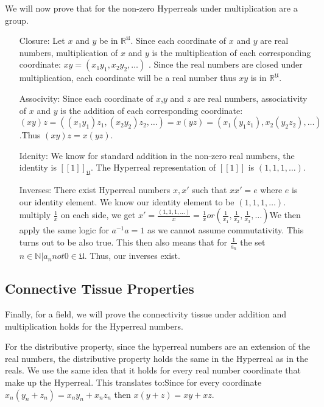 \documentclass[12pt]{report}
\newcommand{\R}{\mathbb{R}}
\newcommand{\N}{\mathbb{N}}
\newcommand{\U}{\mathfrak{U}}
\begin{document}
We will now prove that for the non-zero Hyperreals under multiplication are a group.
\begin{enumerate}
    \item[Closure:]Let $x$ and $y$ be in $\R^{\U}$.
    Since each coordinate of $x$ and $y$ are real numbers, multiplication of $x$ and $y$ is the multiplication of each corresponding coordinate: $xy = (x_1 y_1, x_2 y_2,\ldots)$ .
    Since the real numbers are closed under multiplication, each coordinate will be a real number thus $xy$ is in $\R^\U$.
    \item[Associvity:] Since each coordinate of $x$,$y$ and $z$ are real numbers, associativity of $x$ and $y $ is the addition of each corresponding coordinate: $(xy)z = ((x_1 y_1)z_1, (x_2 y_2)z_2,\ldots) =x(yz) = (x_1  (y_1 z_1), x_2(y_2 z_2),\ldots)$.Thus $(xy)z= x(yz)$.
    \item[Idenity:]We know for standard addition in the non-zero real numbers, the identity is $[[1]]_{\U}$.
    The Hyperreal representation of $[[1]]$ is $(1, 1, 1,\ldots)$.
    \item[Inverses:]There exist Hyperreal numbers $x, x'$ such that $xx' = e $ where $e$ is our identity element.
    We know our identity element to be $(1, 1, 1, \ldots)$.
    multiply $\frac{1}{x}$ on each side, we get $x' = \frac{(1, 1, 1,\ldots)}{x} = \frac{1}{x} or (\frac{1}{x_1}, \frac{1}{x_2}, \frac{1}{x_3},\ldots)$We then apply the same logic for $a^{-1} a =1$ as we cannot assume commutativity.
    This turns out to be also true.
    This then also means that for $\frac{1}{a_n}$ the set ${n \in \N| a_n not 0 } \in \U$.
    Thus, our inverses exist.
\end{enumerate}
\subsection*{Connective Tissue Properties}
Finally, for a field, we will prove the connectivity tissue under addition and multiplication holds for the Hyperreal numbers.
\newline \par
For the distributive property, since the hyperreal numbers are an extension of the real numbers, the distributive property holds the same in the Hyperreal as in the reals.
We use the same idea that it holds for every real number coordinate that make up the Hyperreal.
This translates to:\newline Since for every coordinate $x_n(y_n+z_n) = x_n y_n + x_n z_n$ then $x(y+z)= xy+xz$.\newline
\end{document}
